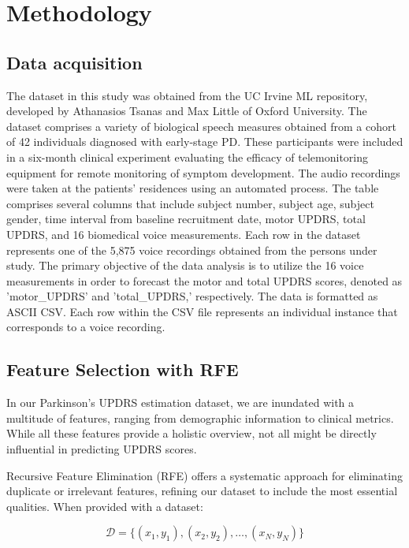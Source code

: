 \section{Methodology}
\subsection{Data acquisition}
The dataset in this study was obtained from the UC Irvine ML repository, developed by Athanasios Tsanas and Max Little of Oxford University\cite{6}. The dataset comprises a variety of biological speech measures obtained from a cohort of 42 individuals diagnosed with early-stage PD. These participants were included in a six-month clinical experiment evaluating the efficacy of telemonitoring equipment for remote monitoring of symptom development. The audio recordings were taken at the patients' residences using an automated process. The table comprises several columns that include subject number, subject age, subject gender, time interval from baseline recruitment date, motor UPDRS, total UPDRS, and 16 biomedical voice measurements. Each row in the dataset represents one of the 5,875 voice recordings obtained from the persons under study. The primary objective of the data analysis is to utilize the 16 voice measurements in order to forecast the motor and total UPDRS scores, denoted as 'motor\_UPDRS' and 'total\_UPDRS,' respectively. The data is formatted as ASCII CSV. Each row within the CSV file represents an individual instance that corresponds to a voice recording. 


\subsection{Feature Selection with RFE}

In our Parkinson's UPDRS estimation dataset, we are inundated with a multitude of features, ranging from demographic information to clinical metrics. While all these features provide a holistic overview, not all might be directly influential in predicting UPDRS scores.

Recursive Feature Elimination (RFE)\cite{8} offers a systematic approach for eliminating duplicate or irrelevant features, refining our dataset to include the most essential qualities. When provided with a dataset:

\begin{equation}
    \mathcal{D} = \{(x_1, y_1), (x_2, y_2), \dots, (x_N, y_N)\}
\end{equation}


